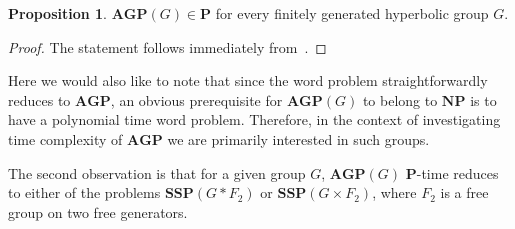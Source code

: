 \documentclass[10pt]{amsart}
\theoremstyle{definition}
\newtheorem{proposition}[theorem]{Proposition}
\def\P{{\mathbf{P}}}
\def\NP{{\mathbf{NP}}}
\def\SSP{{\mathbf{SSP}}}
\def\AGP{{\mathbf{AGP}}}
\begin{document}
\begin{proposition}\label{pr:agp_hyp}
$\AGP(G)\in\P$ for every finitely generated hyperbolic group $G$.
\end{proposition}
\begin{proof}
The statement follows immediately from~\cite[Proposition 5.5]{Miasnikov-Nikolaev-Ushakov:2014a}.
\end{proof}
Here we would also like to note that since the word problem straightforwardly reduces to $\AGP$, an obvious prerequisite for $\AGP(G)$ to belong to $\NP$ is to have a polynomial time word problem. Therefore, in the context of investigating time complexity of $\AGP$ we are primarily interested in such groups.


The second observation is that for a given group $G$, $\AGP(G)$ $\P$-time reduces to either of the problems $\SSP(G\ast F_2)$ or $\SSP(G\times F_2)$, where $F_2$ is a free group on two free generators.
\end{document}
